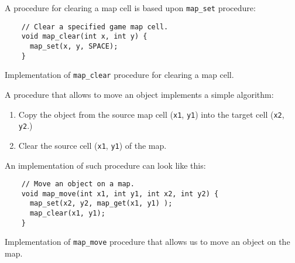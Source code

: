 \documentclass[../sparc.tex]{subfiles}
\begin{document}
A procedure for clearing a map cell is based upon \texttt{map_set}
procedure:

\begin{listing}[H]
  \begin{verbatim}
    // Clear a specified game map cell.
    void map_clear(int x, int y) {
      map_set(x, y, SPACE);
    }
  \end{verbatim}
  \caption{Implementation of \texttt{map_clear} procedure for clearing
    a map cell.}
  \label{listing:game-dev-map-get--procedure}
\end{listing}

A procedure that allows to move an object implements a simple algorithm:
\begin{enumerate}
\item Copy the object from the source map cell (\texttt{x1},
  \texttt{y1}) into the target cell (\texttt{x2},
  \texttt{y2}.)
\item Clear the source cell (\texttt{x1}, \texttt{y1}) of the
  map.
\end{enumerate}

An implementation of such procedure can look like this:

\begin{listing}[H]
  \begin{verbatim}
    // Move an object on a map.
    void map_move(int x1, int y1, int x2, int y2) {
      map_set(x2, y2, map_get(x1, y1) );
      map_clear(x1, y1);
    }
  \end{verbatim}
  \caption{Implementation of \texttt{map_move} procedure that allows us
    to move an object on the map.}
  \label{listing:game-dev-map-move---procedure}
\end{listing}
\end{document}
